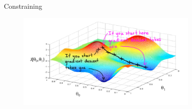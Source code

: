 \documentclass[presentation]{beamer}\mode<presentation>{\usetheme{AMSBolognaFC}}
\begin{document}
\begin{frame}[allowframebreaks]{Constraining}
    \framebreak
    
    \begin{figure}
        \centering
        \includegraphics[width=0.8\textwidth]{figures/nn-gradient-descent.png}
    \end{figure}    
\end{frame}
\end{document}
